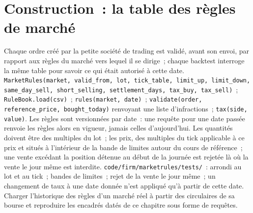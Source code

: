 \section{Construction~: la table des règles de marché}\label{bld:m1:asian-and-emerging-equity-markets:rules}

\begin{build}
 Chaque ordre créé par la petite société de trading est validé, avant son envoi,
par rapport aux règles du marché vers lequel il se dirige~; chaque backtest interroge la même table pour
savoir ce qui était autorisé à cette date.  \texttt{MarketRules(market, valid\_from, lot, tick\_table,
limit\_up, limit\_down, same\_day\_sell, short\_selling, settlement\_days, tax\_buy, tax\_sell)}~; \texttt{RuleBook.load(csv)}~; \texttt{rules(market, date)}~; \texttt{validate(order, reference\_price,
bought\_today)} renvoyant une liste d'infractions~; \texttt{tax(side, value)}.
 Les règles sont versionnées par date~: une requête pour une date passée renvoie les
règles alors en vigueur, jamais celles d'aujourd'hui. Les quantités doivent être des multiples du
lot~; les prix, des multiples du tick applicable à ce prix et situés à l'intérieur de la bande de
limites autour du cours de référence~; une vente excédant la position détenue au début de la journée
est rejetée là où la vente le jour même est interdite.
 \texttt{code/firm/marketrules/tests/}~: arrondi au lot et au tick~; bandes
de limites~; rejet de la vente le jour même~; un changement de taux à une date donnée n'est appliqué
qu'à partir de cette date.
 Charger l'historique des règles d'un marché réel à partir des circulaires de sa bourse et
reproduire les encadrés datés de ce chapitre sous forme de requêtes.
\end{build}

